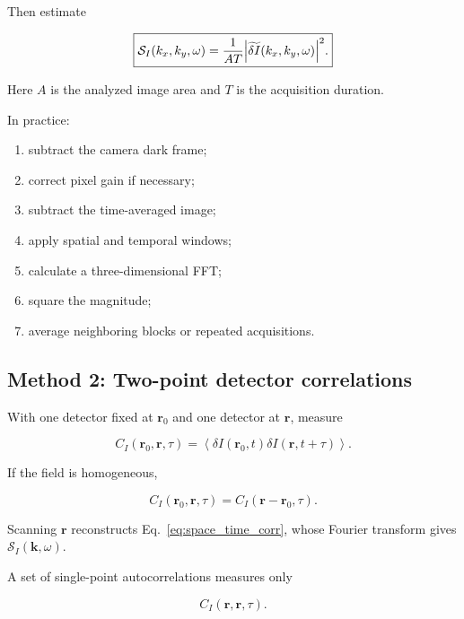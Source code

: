 \documentclass[11pt]{article}
\newcommand{\avg}[1]{\left\langle #1 \right\rangle}
\newcommand{\SII}{\mathcal{S}_{I}}
\newcommand{\kvec}{\mathbf{k}}
\newcommand{\rvec}{\mathbf{r}}
\begin{document}
Then estimate

\begin{equation}
\boxed{
    \SII(k_x,k_y,\omega)
    =
    \frac{1}{A T}
    \abs{
        \widetilde{\delta I}(k_x,k_y,\omega)
    }^2.
}
\label{eq:periodogram}
\end{equation}

Here $A$ is the analyzed image area and $T$ is the acquisition duration.

In practice:

\begin{enumerate}[label=\arabic*.]
    \item subtract the camera dark frame;
    \item correct pixel gain if necessary;
    \item subtract the time-averaged image;
    \item apply spatial and temporal windows;
    \item calculate a three-dimensional FFT;
    \item square the magnitude;
    \item average neighboring blocks or repeated acquisitions.
\end{enumerate}

\subsection{Method 2: Two-point detector correlations}

With one detector fixed at $\rvec_0$ and one detector at $\rvec$, measure

\begin{equation}
    C_I(\rvec_0,\rvec,\tau)
    =
    \avg{
        \delta I(\rvec_0,t)
        \delta I(\rvec,t+\tau)
    }.
\end{equation}

If the field is homogeneous,

\begin{equation}
    C_I(\rvec_0,\rvec,\tau)
    =
    C_I(\rvec-\rvec_0,\tau).
\end{equation}

Scanning $\rvec$ reconstructs Eq.~\eqref{eq:space_time_corr}, whose Fourier
transform gives $\SII(\kvec,\omega)$.

A set of single-point autocorrelations measures only

\begin{equation}
    C_I(\rvec,\rvec,\tau).
\end{equation}
\end{document}
